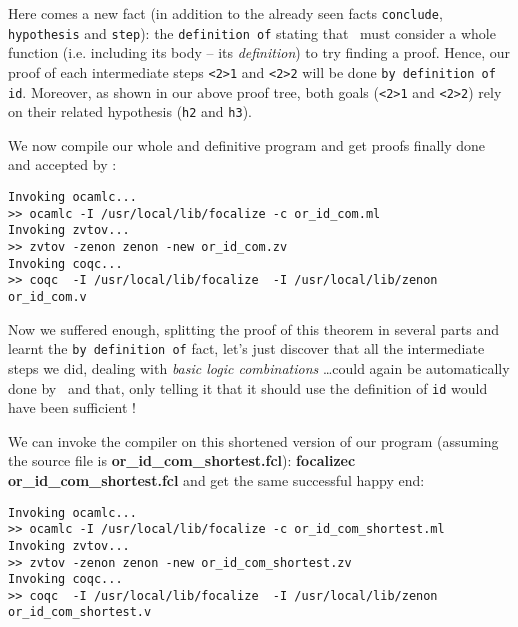 \documentclass[11pt,a4paper,twoside,onecolumn,fullpage]{article}
\begin{document}
Here comes
a new fact (in addition to the already seen facts \lstinline"conclude",
\lstinline"hypothesis" and \lstinline"step"): the
\lstinline"definition of" stating that \zenon\ must consider a whole
function (i.e. including its body -- its {\em definition}) to try
finding a proof. Hence, our proof of each intermediate steps
\lstinline"<2>1" and \lstinline"<2>2" will be done
\lstinline"by definition of id". Moreover, as shown in our above proof
tree, both goals (\lstinline"<2>1" and \lstinline"<2>2") rely on their
related hypothesis (\lstinline"h2" and \lstinline"h3").

{\scriptsize
}

We now compile our whole and definitive program and get proofs finally
done and accepted by \coq:

{\scriptsize
\begin{verbatim}
Invoking ocamlc...
>> ocamlc -I /usr/local/lib/focalize -c or_id_com.ml
Invoking zvtov...
>> zvtov -zenon zenon -new or_id_com.zv
Invoking coqc...                                                
>> coqc  -I /usr/local/lib/focalize  -I /usr/local/lib/zenon or_id_com.v
\end{verbatim}}

Now we suffered enough, splitting the proof of this theorem in several
parts and learnt the \lstinline{by definition of} fact, let's just
discover that all the intermediate steps we did, dealing with {\em basic
logic combinations} \ldots could again be automatically done by
\zenon\ and that, only telling it that it should use the definition of
\lstinline{id} would have been sufficient !

{\scriptsize
}

We can invoke the compiler on this shortened version of our program
(assuming the source file is \textbf{or\_id\_com\_shortest.fcl}):
\textbf{focalizec or\_id\_com\_shortest.fcl} and get the same successful
happy end:

{\scriptsize
\begin{verbatim}
Invoking ocamlc...
>> ocamlc -I /usr/local/lib/focalize -c or_id_com_shortest.ml
Invoking zvtov...
>> zvtov -zenon zenon -new or_id_com_shortest.zv
Invoking coqc...                                               
>> coqc  -I /usr/local/lib/focalize  -I /usr/local/lib/zenon or_id_com_shortest.v
\end{verbatim}}
\end{document}
